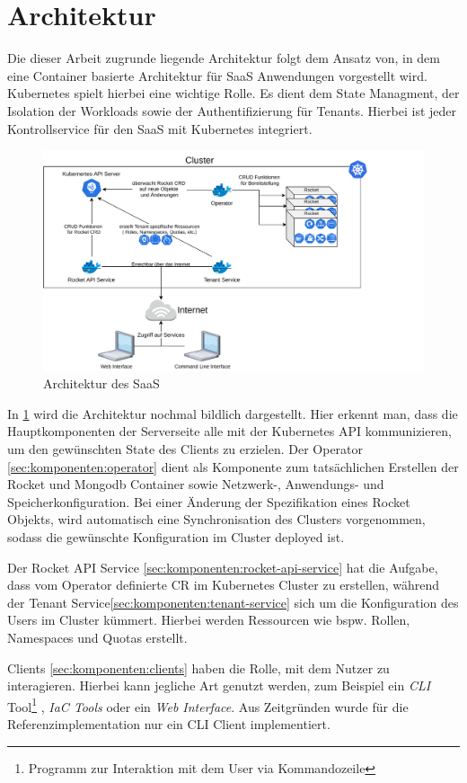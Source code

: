 \section{Architektur}
\label{sec:komponenten:architektur}

Die dieser Arbeit zugrunde liegende Architektur folgt dem Ansatz von\cite{Truyen2016}, in dem eine Container basierte
Architektur für \ac{SaaS} Anwendungen vorgestellt wird. Kubernetes spielt hierbei eine wichtige Rolle. Es dient dem State
Managment, der Isolation der Workloads sowie der Authentifizierung für Tenants. Hierbei ist jeder Kontrollservice für den \ac{SaaS}
mit Kubernetes integriert.

\begin{figure}[h]
  \includegraphics[width=45em]{gfx/chapters/3_komponenten/saas_architecture.pdf}
  \caption{Architektur des \ac{SaaS}}
  \label{fig:architektur}
\end{figure}

In \ref{fig:architektur} wird die Architektur nochmal bildlich dargestellt.
Hier erkennt man, dass die Hauptkomponenten der Serverseite alle mit der Kubernetes API kommunizieren,
um den gewünschten State des Clients zu erzielen. Der Operator \ref{sec:komponenten:operator} dient als Komponente zum tatsächlichen
Erstellen der Rocket und Mongodb Container sowie Netzwerk-, Anwendungs- und Speicherkonfiguration.
Bei einer Änderung der Spezifikation eines Rocket Objekts, wird automatisch eine Synchronisation des 
Clusters vorgenommen, sodass die gewünschte Konfiguration im Cluster deployed ist.

Der Rocket API Service \ref{sec:komponenten:rocket-api-service} hat die Aufgabe, 
dass vom Operator definierte \ac{CR} im Kubernetes Cluster zu erstellen, während der Tenant Service\ref{sec:komponenten:tenant-service}
sich um die Konfiguration des Users im Cluster kümmert.
Hierbei werden Ressourcen wie bspw. Rollen, Namespaces und Quotas erstellt.

Clients \ref{sec:komponenten:clients} haben die Rolle, mit dem Nutzer zu interagieren. Hierbei kann jegliche Art genutzt werden,
zum Beispiel ein \emph{\ac{CLI}} Tool\footnote{Programm zur Interaktion mit dem User via Kommandozeile}
, \emph{\ac{IaC} Tools} oder ein \emph{Web Interface}. Aus Zeitgründen wurde für die Referenzimplementation nur
ein \ac{CLI} Client implementiert.
